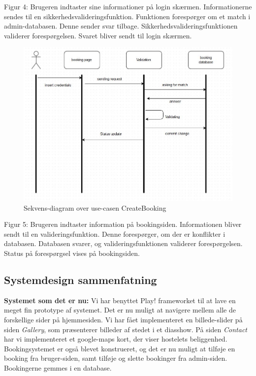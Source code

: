 \documentclass[12pt,a4paper]{article}
\begin{document}
Figur 4:
Brugeren indtaster sine informationer på login skærmen.
Informationerne sendes til en sikkerhedsvalideringsfunktion.
Funktionen forespørger om et match i admin-databasen.
Denne sender svar tilbage.
Sikkerhedsvalideringsfunktionen validerer forespørgelsen.
Svaret bliver sendt til login skærmen.
\begin{figure}[H]
\centering
\includegraphics[scale=0.6]{customerLog-in.jpg}
\caption{Sekvens-diagram over use-casen CreateBooking}
\end{figure}
Figur 5:
Brugeren indtaster information på bookingsiden.
Informationen bliver sendt til en valideringsfunktion.
Denne forespørger, om der er konflikter i databasen.
Databasen svarer, og
valideringsfunktionen validerer forespørgelsen.
Status på forespørgsel vises på bookingsiden.

\subsection{Systemdesign sammenfatning}
\textbf{Systemet som det er nu:}
Vi har benyttet Play! frameworket til at lave en meget fin prototype af systemet.
Det er nu muligt at navigere mellem alle de forskellige sider på hjemmesiden. Vi har fået implementeret en billede-slider på siden \textit{Gallery}, som præsenterer billeder af stedet i et diasshow. På siden \textit{Contact} har vi implementeret et google-maps kort, der viser hostelets beliggenhed. Bookingsystemet er også blevet konstrueret, og det er nu muligt at tilføje en booking fra bruger-siden, samt tilføje og slette bookinger fra admin-siden. Bookingerne gemmes i en database.    
\end{document}
